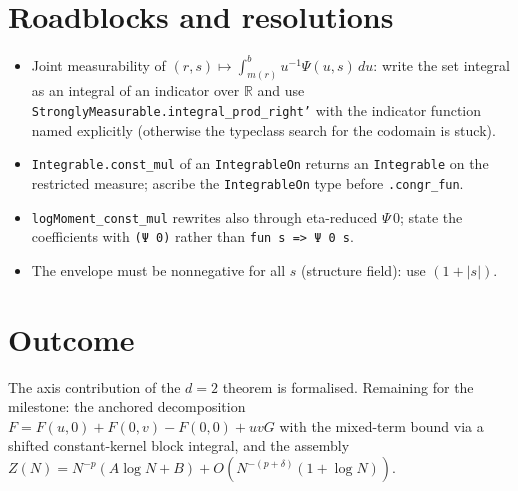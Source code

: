\documentclass[11pt]{article}
\begin{document}
\section{Roadblocks and resolutions}
\begin{itemize}
\item Joint measurability of $(r,s)\mapsto\int_{m(r)}^b u^{-1}\Psi(u,s)\,du$: write the set integral as
an integral of an indicator over $\mathbb R$ and use
\texttt{StronglyMeasurable.integral\_prod\_right'} with the indicator function named explicitly
(otherwise the typeclass search for the codomain is stuck).
\item \texttt{Integrable.const\_mul} of an \texttt{IntegrableOn} returns an \texttt{Integrable} on the
restricted measure; ascribe the \texttt{IntegrableOn} type before \texttt{.congr\_fun}.
\item \texttt{logMoment\_const\_mul} rewrites also through eta-reduced $\Psi\,0$; state the
coefficients with \texttt{(Ψ 0)} rather than \texttt{fun s => Ψ 0 s}.
\item The envelope must be nonnegative for all $s$ (structure field): use $(1+|s|)$.
\end{itemize}

\section{Outcome}
The axis contribution of the $d=2$ theorem is formalised. Remaining for the milestone: the anchored
decomposition $F=F(u,0)+F(0,v)-F(0,0)+uvG$ with the mixed-term bound via a shifted constant-kernel
block integral, and the assembly $Z(N)=N^{-p}(A\log N+B)+O(N^{-(p+\delta)}(1+\log N))$.
\end{document}
